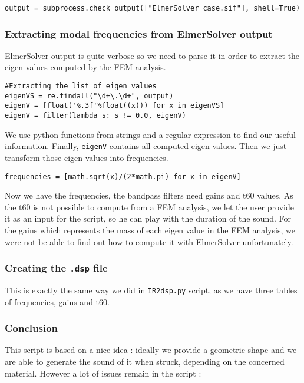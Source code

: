 \begin{lstlisting}
output = subprocess.check_output(["ElmerSolver case.sif"], shell=True)
\end{lstlisting}

\subsubsection*{Extracting modal frequencies from ElmerSolver output}

ElmerSolver output is quite verbose so we need to parse it in order to extract the eigen values computed by the FEM analysis.

\begin{lstlisting}
#Extracting the list of eigen values
eigenVS = re.findall("\d+\.\d+", output)
eigenV = [float('%.3f'%float((x))) for x in eigenVS]
eigenV = filter(lambda s: s != 0.0, eigenV)
\end{lstlisting}

We use python functions from strings and a regular expression to find our useful information. Finally, \texttt{eigenV} contains all computed eigen values.
Then we just transform those eigen values into frequencies.

\begin{lstlisting}
frequencies = [math.sqrt(x)/(2*math.pi) for x in eigenV]
\end{lstlisting}

Now we have the frequencies, the bandpass filters need gains and t60 values. As the t60 is not possible to compute from a FEM analysis, we let the user provide it as an input for the script, so he can play with the duration of the sound.
For the gains which represents the mass of each eigen value in the FEM analysis, we were not be able to find out how to compute it with ElmerSolver unfortunately.

\subsubsection*{Creating the \texttt{.dsp} file}

This is exactly the same way we did in \texttt{IR2dsp.py} script, as we have three tables of frequencies, gains and t60.

\subsubsection*{Conclusion}

This script is based on a nice idea : ideally we provide a geometric shape and we are able to generate the sound of it when struck, depending on the concerned material.
However a lot of issues remain in the script :

